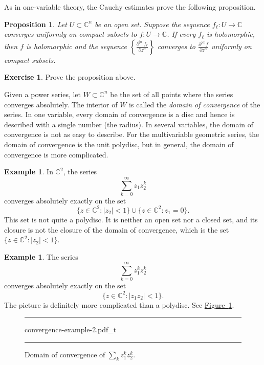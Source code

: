 \documentclass[12pt,openany]{book}
\newcommand{\sabs}[1]{\lvert {#1} \rvert}
\newcommand{\C}{{\mathbb{C}}}
\newcommand{\myindex}[1]{#1\index{#1}}
\theoremstyle{plain}
\newtheorem{prop}[thm]{Proposition}
\theoremstyle{remark}
\theoremstyle{definition}
\newenvironment{exbox}{%
    \def\FrameCommand{\vrule width 1pt \relax\hspace{10pt}}%
    \MakeFramed{\advance\hsize-\width\FrameRestore}%
}{%
    \endMakeFramed
}
\newenvironment{myfig}{%
\begin{figure}[h!t]
\noindent\rule{\textwidth}{0.5pt}\vspace{12pt}\par\centering}%
{\par\noindent\rule{\textwidth}{0.5pt}
\end{figure}}
\theoremstyle{exercise}
\newtheorem{exercise}{Exercise}[section]
\theoremstyle{example}
\newtheorem{example}[thm]{Example}
\newcommand{\figureref}[1]{\hyperref[#1]{Figure~\ref*{#1}}}
\begin{document}
As in one-variable theory, the Cauchy estimates prove the following
proposition.

\begin{prop}
Let $U \subset \C^n$ be an open set.
Suppose the sequence $f_\ell \colon U \to \C$ converges uniformly on compact subsets
to $f \colon U \to \C$.  If every $f_\ell$ is holomorphic, then $f$ is
holomorphic and the sequence
$\left\{ \frac{\partial^{\sabs{\alpha}} f_\ell}{\partial z^\alpha}\right\}$
converges to
$\frac{\partial^{\sabs{\alpha}} f}{\partial z^\alpha}$ uniformly on compact
subsets.
\end{prop}

\begin{exbox}
\begin{exercise}
Prove the proposition above.
\end{exercise}
\end{exbox}

Given a power series,
let $W \subset \C^n$ be the set of all points where the series
converges absolutely.
The interior of $W$ is called the
\emph{\myindex{domain of convergence}} of the series.
In one variable, every domain of convergence is a disc and hence is
described with a single number (the radius).
In several variables, the domain of convergence
is not as easy to describe.
For the multivariable geometric series,
the domain of convergence is the unit polydisc,
but in general, the domain of convergence is more complicated.

\begin{example}
In $\C^2$, the series
\begin{equation*}
\sum_{k=0}^\infty z_1 z_2^k
\end{equation*}
converges absolutely exactly on the set
\begin{equation*}
\bigl\{ z \in \C^2 : \sabs{z_2} < 1 \bigr\}
\cup
\bigl\{ z \in \C^2 : z_1 = 0 \bigr\} .
\end{equation*}
This set is not quite a polydisc.  It is neither an open set nor a closed set,
and its closure is not the closure of the domain of convergence,
which is the set $\bigl\{ z \in \C^2 : \sabs{z_2} < 1 \bigr\}$.
\end{example}

\begin{example}
The series
\begin{equation*}
\sum_{k=0}^\infty z_1^k z_2^k
\end{equation*}
converges absolutely exactly on the set
\begin{equation*}
\bigl\{ z \in \C^2 : \sabs{z_1 z_2} < 1 \bigr\} .
\end{equation*}
The picture is definitely more complicated than a polydisc.
See \figureref{fig:convergence-example-2}.
\begin{myfig}
{convergence-example-2.pdf_t}
\caption{Domain of convergence of $\sum_k z_1^kz_2^k$.\label{fig:convergence-example-2}}
\end{myfig}
\end{example}
\end{document}
